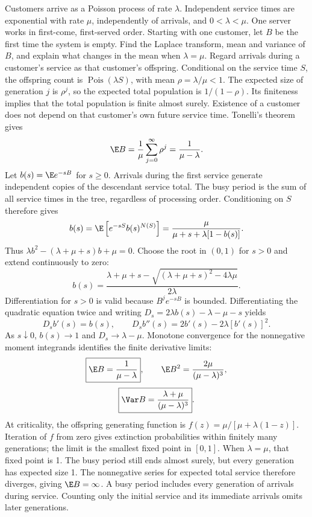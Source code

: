 Customers arrive as a Poisson process of rate $\lambda$. Independent service times are exponential with rate $\mu$, independently of arrivals, and $0<\lambda<\mu$. One server works in first-come, first-served order. Starting with one customer, let $B$ be the first time the system is empty. Find the Laplace transform, mean and variance of $B$, and explain what changes in the mean when $\lambda=\mu$.
\solution Regard arrivals during a customer's service as that customer's offspring. Conditional on the service time $S$, the offspring count is $\operatorname{Pois}(\lambda S)$, with mean $\rho=\lambda/\mu<1$. The expected size of generation $j$ is $\rho^j$, so the expected total population is $1/(1-\rho)$. Its finiteness implies that the total population is finite almost surely. Existence of a customer does not depend on that customer's own future service time. Tonelli's theorem gives
\[
 \E B=\frac1\mu\sum_{j=0}^\infty\rho^j=\frac1{\mu-\lambda}.
\]
Let $b(s)=\E e^{-sB}$ for $s\ge0$. Arrivals during the first service generate independent copies of the descendant service total. The busy period is the sum of all service times in the tree, regardless of processing order. Conditioning on $S$ therefore gives
\[
 b(s)=\E\left[e^{-sS}b(s)^{N(S)}\right]
 =\frac{\mu}{\mu+s+\lambda[1-b(s)]}.
\]
Thus $\lambda b^2-(\lambda+\mu+s)b+\mu=0$. Choose the root in $(0,1)$ for $s>0$ and extend continuously to zero:
\[
 \boxed{b(s)=\frac{\lambda+\mu+s-\sqrt{(\lambda+\mu+s)^2-4\lambda\mu}}{2\lambda}}.
\]
Differentiation for $s>0$ is valid because $B^je^{-sB}$ is bounded. Differentiating the quadratic equation twice and writing $D_s=2\lambda b(s)-\lambda-\mu-s$ yields
\[
 D_s b'(s)=b(s),\qquad
 D_s b''(s)=2b'(s)-2\lambda[b'(s)]^2.
\]
As $s\downarrow0$, $b(s)\to1$ and $D_s\to\lambda-\mu$. Monotone convergence for the nonnegative moment integrands identifies the finite derivative limits:
\[
 \boxed{\E B=\frac1{\mu-\lambda}},\qquad
 \E B^2=\frac{2\mu}{(\mu-\lambda)^3},
\]
\[
 \boxed{\Var B=\frac{\lambda+\mu}{(\mu-\lambda)^3}}.
\]
At criticality, the offspring generating function is $f(z)=\mu/[\mu+\lambda(1-z)]$. Iteration of $f$ from zero gives extinction probabilities within finitely many generations; the limit is the smallest fixed point in $[0,1]$. When $\lambda=\mu$, that fixed point is 1. The busy period still ends almost surely, but every generation has expected size 1. The nonnegative series for expected total service therefore diverges, giving $\E B=\infty$.
\insight A busy period includes every generation of arrivals during service. Counting only the initial service and its immediate arrivals omits later generations.
